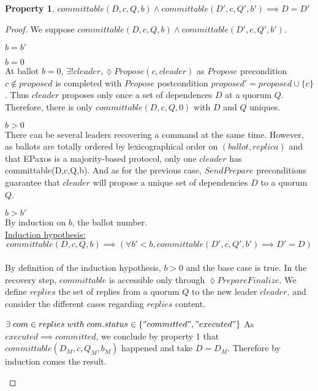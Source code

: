 \documentclass[a4paper]{article}
\theoremstyle{definition}
\theoremstyle{plain}
\newtheorem{property}{Property}
\begin{document}
\begin{property}
$committable(D,c,Q,b) \wedge committable(D',c,Q',b') \implies D=D'$
\end{property}
\begin{proof}
We suppose $committable(D,c,Q,b) \wedge committable(D',c,Q',b')$.
\begin{case}
    \item $b = b'$ 
    \begin{case}
        \item $b=0$\\
        At ballot $b=0$, $\exists! cleader, \lozenge Propose(c, cleader)$ as $Propose$ precondition $c \notin proposed$ is completed with $Propose$ postcondition $proposed' = proposed \cup \{c\}$. Thus $cleader$ proposes only once a set of dependences $D$ at a quorum $Q$. Therefore, there is only $committable(D,c,Q,0)$ with $D$ and $Q$ uniques.
        \item $b>0$ \\
        There can be several leaders recovering a command at the same time. However, as ballots are totally ordered by lexicographical order on $(ballot, replica)$ and that EPaxos is a majority-based protocol, only one $cleader$ has committable(D,c,Q,b). And as for the previous case,  $SendPrepare$ preconditions guarantee that $cleader$ will propose a unique set of dependencies $D$ to a quorum $Q$.
    \end{case}
    \item $b > b'$ \\
    By induction on $b$, the ballot number. \\
    \underline{Induction hypothesis:}
    \[committable(D,c,Q,b) \implies (\forall b' < b, committable(D',c,Q',b') \implies D' = D)\]\\
    By definition of the induction hypothesis, $b>0$ and the base case is true. In the recovery step, $committable$ is accessible only through $\lozenge PrepareFinalize$. We define $replies$ the set of replies from a quorum $Q$ to the new leader $cleader$, and consider the different cases regarding $replies$ content.
    
    \begin{case}
        \item  $\exists \; com \in replies \; with \; com.status \in \{"committed", "executed"\}$
        As $executed \implies committed$, we conclude by property 1 that $committable(D_M,c,Q_M,b_M)$ happened and take $D = D_M$. Therefore by induction comes the result.
        

\end{case}
\end{case}
\end{proof}
\end{document}

